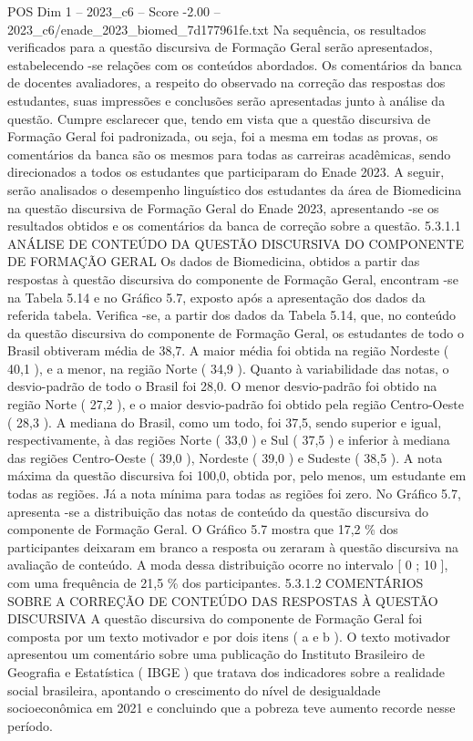 \begin{textsample}{POS Dim 1 – 2023\_c6 – Score -2.00 – 2023\_c6/enade\_2023\_biomed\_7d177961fe.txt}
Na sequência, os resultados verificados para a questão discursiva de Formação Geral serão apresentados, estabelecendo -se relações com os conteúdos abordados.
Os comentários da banca de docentes avaliadores, a respeito do observado na correção das respostas dos estudantes, suas impressões e conclusões serão apresentadas junto à análise da questão.
Cumpre esclarecer que, tendo em vista que a questão discursiva de Formação Geral foi padronizada, ou seja, foi a mesma em todas as provas, os comentários da banca são os mesmos para todas as carreiras acadêmicas, sendo direcionados a todos os estudantes que participaram do Enade 2023.
A seguir, serão analisados o desempenho linguístico dos estudantes da área de Biomedicina na questão discursiva de Formação Geral do Enade 2023, apresentando -se os resultados obtidos e os comentários da banca de correção sobre a questão. 5.3.1.1 ANÁLISE DE CONTEÚDO DA QUESTÃO DISCURSIVA DO COMPONENTE DE FORMAÇÃO GERAL Os dados de Biomedicina, obtidos a partir das respostas à questão discursiva do componente de Formação Geral, encontram -se na Tabela 5.14 e no Gráfico 5.7, exposto após a apresentação dos dados da referida tabela.
Verifica -se, a partir dos dados da Tabela 5.14, que, no conteúdo da questão discursiva do componente de Formação Geral, os estudantes de todo o Brasil obtiveram média de 38,7.
A maior média foi obtida na região Nordeste ( 40,1 ), e a menor, na região Norte ( 34,9 ).
Quanto à variabilidade das notas, o desvio-padrão de todo o Brasil foi 28,0.
O menor desvio-padrão foi obtido na região Norte ( 27,2 ), e o maior desvio-padrão foi obtido pela região Centro-Oeste ( 28,3 ).
A mediana do Brasil, como um todo, foi 37,5, sendo superior e igual, respectivamente, à das regiões Norte ( 33,0 ) e Sul ( 37,5 ) e inferior à mediana das regiões Centro-Oeste ( 39,0 ), Nordeste ( 39,0 ) e Sudeste ( 38,5 ).
A nota máxima da questão discursiva foi 100,0, obtida por, pelo menos, um estudante em todas as regiões.
Já a nota mínima para todas as regiões foi zero.
No Gráfico 5.7, apresenta -se a distribuição das notas de conteúdo da questão discursiva do componente de Formação Geral.
O Gráfico 5.7 mostra que 17,2 \% dos participantes deixaram em branco a resposta ou zeraram à questão discursiva na avaliação de conteúdo.
A moda dessa distribuição ocorre no intervalo [ 0 ; 10 ], com uma frequência de 21,5 \% dos participantes. 5.3.1.2 COMENTÁRIOS SOBRE A CORREÇÃO DE CONTEÚDO DAS RESPOSTAS À QUESTÃO DISCURSIVA A questão discursiva do componente de Formação Geral foi composta por um texto motivador e por dois itens ( a e b ).
O texto motivador apresentou um comentário sobre uma publicação do Instituto Brasileiro de Geografia e Estatística ( IBGE ) que tratava dos indicadores sobre a realidade social brasileira, apontando o crescimento do nível de desigualdade socioeconômica em 2021 e concluindo que a pobreza teve aumento recorde nesse período.

\end{textsample}
